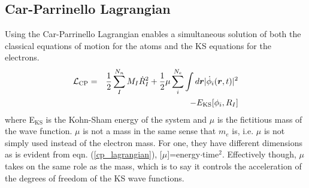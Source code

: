 \documentclass[%
 reprint,
nofootinbib,
 amsmath,amssymb,
 aps,
]{revtex4-2}
\newcommand{\Lagr}{\mathcal{L}}
\begin{document}

\subsection{Car-Parrinello Lagrangian}
Using the Car-Parrinello Lagrangian enables a simultaneous solution of both the classical equations of motion for the atoms and the KS equations for the electrons.
\begin{align}
\Lagr_{\text{CP}} =&& \frac{1}{2}\sum_I^{N_n}M_I\dot{R}_I^2+\frac{1}{2}\mu \sum_i^{N_e}\int d\vb*{r} |\dot{\phi}_i(\vb*{r},t)|^2\nonumber\\
&&-E_{\text{KS}}[{\phi_i},{R_I}] \label{cp_lagrangian}
\end{align}
where E$_{\text{KS}}$ is the Kohn-Sham energy of the system and $\mu$ is the fictitious mass of the wave function. $\mu$ is not a mass in the same sense that $m_e$ is, i.e. $\mu$ is not simply used instead of the electron mass. For one, they have different dimensions as is evident from eqn. (\ref{cp_lagrangian}), [$\mu$]=energy$\cdot$time$^2$. Effectively though, $\mu$ takes on the same role as the mass, which is to say it controls the acceleration of the degrees of freedom of the KS wave functions.
\end{document}
